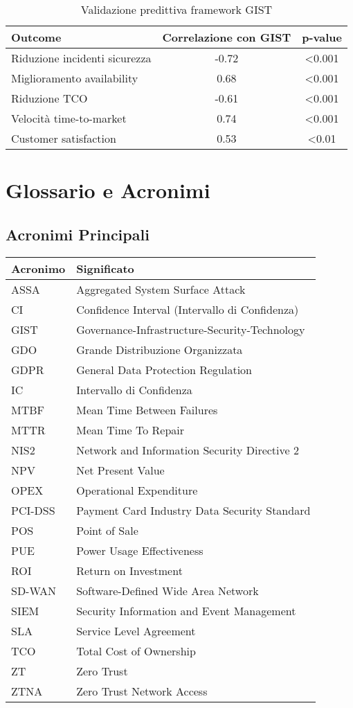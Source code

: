 \begin{table}[htbp]
\centering
\begin{tabular}{lcc}
\toprule
\textbf{Outcome} & \textbf{Correlazione con GIST} & \textbf{p-value} \\
\midrule
Riduzione incidenti sicurezza & -0.72 & <0.001 \\
Miglioramento availability & 0.68 & <0.001 \\
Riduzione TCO & -0.61 & <0.001 \\
Velocità time-to-market & 0.74 & <0.001 \\
Customer satisfaction & 0.53 & <0.01 \\
\bottomrule
\end{tabular}
\caption{Validazione predittiva framework GIST}
\end{table}

\chapter{\texorpdfstring{Glossario e Acronimi}{Appendice D - Glossario e Acronimi}}

\section{\texorpdfstring{Acronimi Principali}{D.1 - Acronimi Principali}}

\begin{tabular}{ll}
\textbf{Acronimo} & \textbf{Significato} \\
\hline
ASSA & Aggregated System Surface Attack \\
CI & Confidence Interval (Intervallo di Confidenza) \\
GIST & Governance-Infrastructure-Security-Technology \\
GDO & Grande Distribuzione Organizzata \\
GDPR & General Data Protection Regulation \\
IC & Intervallo di Confidenza \\
MTBF & Mean Time Between Failures \\
MTTR & Mean Time To Repair \\
NIS2 & Network and Information Security Directive 2 \\
NPV & Net Present Value \\
OPEX & Operational Expenditure \\
PCI-DSS & Payment Card Industry Data Security Standard \\
POS & Point of Sale \\
PUE & Power Usage Effectiveness \\
ROI & Return on Investment \\
SD-WAN & Software-Defined Wide Area Network \\
SIEM & Security Information and Event Management \\
SLA & Service Level Agreement \\
TCO & Total Cost of Ownership \\
ZT & Zero Trust \\
ZTNA & Zero Trust Network Access \\
\end{tabular}

